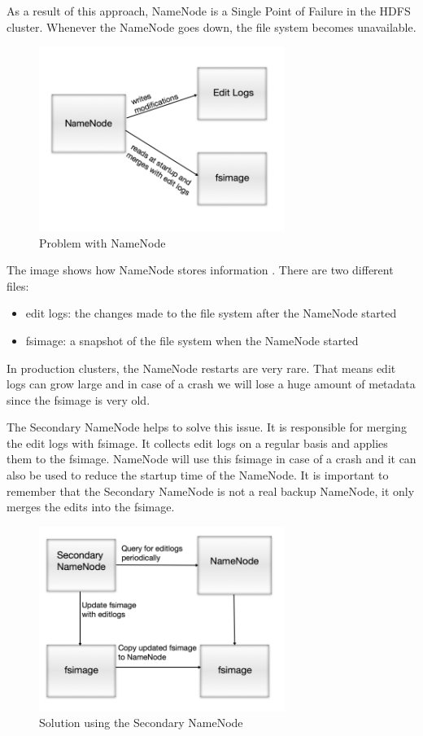 As a result of this approach, NameNode is a Single Point of Failure in the HDFS cluster. Whenever the NameNode goes down, the file system becomes unavailable.
\begin{figure}[H]
	\includegraphics[width=80mm, keepaspectratio]{figures/namenode_problem.png}
	\centering
	\caption{Problem with NameNode}
\end{figure}
The image shows how NameNode stores information \cite{Secondary-NameNode}. There are two different files:
\begin{itemize}
	\item edit logs: the changes made to the file system after the NameNode started
	\item fsimage: a snapshot of the file system when the NameNode started
\end{itemize}
In production clusters, the NameNode restarts are very rare. That means edit logs can grow large and in case of a crash we will lose a huge amount of metadata since the fsimage is very old.

The Secondary NameNode helps to solve this issue. It is responsible for merging the edit logs with fsimage. It collects edit logs on a regular basis and applies them to the fsimage. NameNode will use this fsimage in case of a crash and it can also be used to reduce the startup time of the NameNode.
It is important to remember that the Secondary NameNode is not a real backup NameNode, it only merges the edits into the fsimage. 

\begin{figure}[H]
	\includegraphics[width=80mm, keepaspectratio]{figures/secondary_namenode.png}
	\centering
	\caption{Solution using the Secondary NameNode}
\end{figure}

